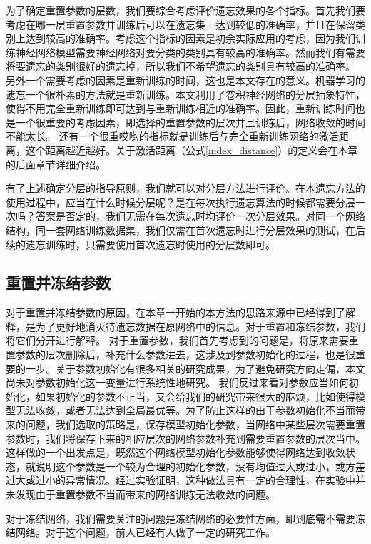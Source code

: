 为了确定重置参数的层数，我们要综合考虑评价遗忘效果的各个指标。首先我们要考虑在哪一层重置参数并训练后可以在遗忘集上达到较低的准确率，并且在保留类别上达到较高的准确率。考虑这个指标的因素是初余实际应用的考虑，因为我们训练神经网络模型需要神经网络对要分类的类别具有较高的准确率。然而我们有需要将要遗忘的类别很好的遗忘掉，所以我们不希望遗忘的类别具有较高的准确率。
另外一个需要考虑的因素是重新训练的时间，这也是本文存在的意义。机器学习的遗忘一个很朴素的方法就是重新训练。本文利用了卷积神经网络的分层抽象特性，使得不用完全重新训练即可达到与重新训练相近的准确率。因此，重新训练时间也是一个很重要的考虑因素，即选择的重置参数的层次并且训练后，网络收敛的时间不能太长。
还有一个很重哎哟的指标就是训练后与完全重新训练网络的激活距离，这个距离越近越好。关于激活距离（公式\ref{index_distance}）的定义会在本章的后面章节详细介绍。

有了上述确定分层的指导原则，我们就可以对分层方法进行评价。在本遗忘方法的使用过程中，应当在什么时候分层呢？是在每次执行遗忘算法的时候都需要分层一次吗？答案是否定的，我们无需在每次遗忘时均评价一次分层效果。对同一个网络结构，同一套网络训练数据集，我们仅需在首次遗忘时进行分层效果的测试，在后续的遗忘训练时，只需要使用首次遗忘时使用的分层数即可。

\subsection{重置并冻结参数}

对于重置并冻结参数的原因，在本章一开始的本方法的思路来源中已经得到了解释，是为了更好地消灭待遗忘数据在原网络中的信息。对于重置和冻结参数，我们将它们分开进行解释。
对于重置参数，我们首先考虑到的问题是，将原来需要重置参数的层次删除后，补充什么参数进去，这涉及到参数初始化的过程，也是很重要的一步。关于参数初始化有很多相关的研究成果，为了避免研究方向走偏，本文尚未对参数初始化这一变量进行系统性地研究。
我们反过来看对参数应当如何初始化，如果初始化的参数不正当，又会给我们的研究带来很大的麻烦，比如使得模型无法收敛，或者无法达到全局最优等。为了防止这样的由于参数初始化不当而带来的问题，我们选取的策略是，保存模型初始化参数，当网络中某些层次需要重置参数时，我们将保存下来的相应层次的网络参数补充到需要重置参数的层次当中。这样做的一个出发点是，既然这个网络模型初始化参数能够使得网络达到收敛状态，就说明这个参数是一个较为合理的初始化参数，没有均值过大或过小，或方差过大或过小的异常情况。经过实验证明，这种做法具有一定的合理性，在实验中并未发现由于重置参数不当而带来的网络训练无法收敛的问题。

对于冻结网络，我们需要关注的问题是冻结网络的必要性方面，即到底需不需要冻结网络。对于这个问题，前人已经有人做了一定的研究工作。

